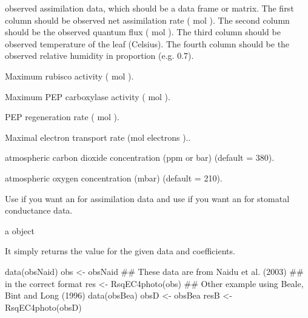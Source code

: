 \documentclass[letterpaper]{book}
\begin{document}
\begin{Arguments}
\begin{ldescription}

\item[\code{obsDat}]  observed assimilation data, which should be a data
frame or matrix.
The first column should be observed net
assimilation rate  (\eqn{\mu}{} mol  ).
The second column should be the observed
quantum flux  (\eqn{\mu}{} mol  ).
The third column should be observed temperature of the leaf
(Celsius).
The fourth column should be the observed relative humidity
in proportion (e.g. 0.7).

\item[\code{iVcmax}] Maximum rubisco activity
(\eqn{\mu}{} mol  ).
\item[\code{iVpmax}] Maximum PEP carboxylase activity  (\eqn{\mu}{} mol
 ).
\item[\code{iVpr}] PEP regeneration rate
(\eqn{\mu}{} mol  ).
\item[\code{iJmax}] Maximal electron transport rate
(\eqn{\mu}{}mol electrons  )..
\item[\code{co2}] atmospheric carbon dioxide concentration
(ppm or \eqn{\mu}{}bar) (default = 380).
\item[\code{o2}] atmospheric oxygen concentration (mbar) (default = 210).
\item[\code{type}] Use  if you want an  for assimilation
data and use  if you want an  for
stomatal conductance data.
\end{ldescription}
\end{Arguments}
%
\begin{Value}

a  object

It simply returns the  value for the given data and coefficients.
\end{Value}
%
\begin{Examples}
\begin{ExampleCode}
data(obsNaid)
obs <- obsNaid
## These data are from Naidu et al. (2003)
## in the correct format
res <- RsqEC4photo(obs)
## Other example using Beale, Bint and Long (1996)
data(obsBea)
obsD <- obsBea
resB <- RsqEC4photo(obsD)
\end{ExampleCode}
\end{Examples}
\end{document}
